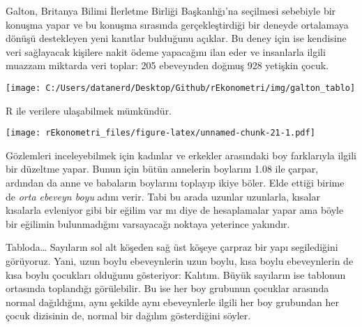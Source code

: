 \documentclass[
]{book}
\newenvironment{Shaded}{\begin{snugshade}}{\end{snugshade}}
\newcommand{\DataTypeTok}[1]{\textcolor[rgb]{0.13,0.29,0.53}{#1}}
\newcommand{\DecValTok}[1]{\textcolor[rgb]{0.00,0.00,0.81}{#1}}
\newcommand{\KeywordTok}[1]{\textcolor[rgb]{0.13,0.29,0.53}{\textbf{#1}}}
\newcommand{\NormalTok}[1]{#1}
\newcommand{\OperatorTok}[1]{\textcolor[rgb]{0.81,0.36,0.00}{\textbf{#1}}}
\newcommand{\OtherTok}[1]{\textcolor[rgb]{0.56,0.35,0.01}{#1}}
\newcommand{\StringTok}[1]{\textcolor[rgb]{0.31,0.60,0.02}{#1}}
\begin{document}
Galton, Britanya Bilimi İlerletme Birliği Başkanlığı'na seçilmesi sebebiyle bir konuşma yapar ve bu konuşma sırasında gerçekleştirdiği bir deneyde ortalamaya dönüşü destekleyen yeni kanıtlar bulduğunu açıklar. Bu deney için ise kendisine veri sağlayacak kişilere nakit ödeme yapacağını ilan eder ve insanlarla ilgili muazzam miktarda veri toplar: 205 ebeveynden doğmuş 928 yetişkin çocuk.

\texttt{[image: C:/Users/datanerd/Desktop/Github/rEkonometri/img/galton\_tablo]}

R ile verilere ulaşabilmek mümkündür.

\begin{Shaded}
\end{Shaded}

\texttt{[image: rEkonometri\_files/figure-latex/unnamed-chunk-21-1.pdf]}

Gözlemleri inceleyebilmek için kadınlar ve erkekler arasındaki boy farklarıyla ilgili bir düzeltme yapar. Bunun için bütün annelerin boylarını 1.08 ile çarpar, ardından da anne ve babaların boylarını toplayıp ikiye böler. Elde ettiği birime de \emph{orta ebeveyn boyu} adını verir. Tabi bu arada uzunlar uzunlarla, kısalar kısalarla evleniyor gibi bir eğilim var mı diye de hesaplamalar yapar ama böyle bir eğilimin bulunmadığını varsayacağı noktaya yeterince yakındır.

Tabloda\ldots{} Sayıların sol alt köşeden sağ üst köşeye çarpraz bir yapı segilediğini görüyoruz. Yani, uzun boylu ebeveynlerin uzun boylu, kısa boylu ebeveynlerin de kısa boylu çocukları olduğunu gösteriyor: Kalıtım. Büyük sayıların ise tablonun ortasında toplandığı görülebilir. Bu ise her boy grubunun çocuklar arasında normal dağıldığını, aynı şekilde aynı ebeveynlerle ilgili her boy grubundan her çocuk dizisinin de, normal bir dağılım gösterdiğini söyler.
\end{document}
